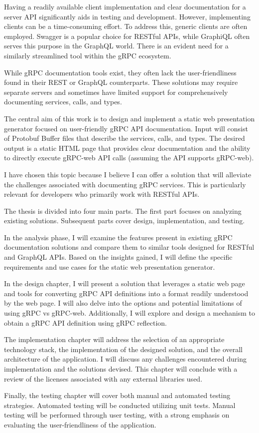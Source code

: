 Having a readily available client implementation and clear documentation for a server API significantly aids in testing and development.
However, implementing clients can be a time-consuming effort.
To address this, generic clients are often employed.
Swagger is a popular choice for RESTful APIs, while GraphiQL often serves this purpose in the GraphQL world.
There is an evident need for a similarly streamlined tool within the gRPC ecosystem.

While gRPC documentation tools exist, they often lack the user-friendliness found in their REST or GraphQL counterparts.
These solutions may require separate servers and sometimes have limited support for comprehensively documenting services, calls, and types.

The central aim of this work is to design and implement a static web presentation generator focused on user-friendly gRPC API documentation.
Input will consist of Protobuf Buffer files that describe the services, calls, and types.
The desired output is a static HTML page that provides clear documentation and the ability to directly execute gRPC-web API calls (assuming the API supports gRPC-web).

I have chosen this topic because I believe I can offer a solution that will alleviate the challenges associated with documenting gRPC services.
This is particularly relevant for developers who primarily work with RESTful APIs.

The thesis is divided into four main parts.
The first part focuses on analyzing existing solutions.
Subsequent parts cover design, implementation, and testing.

In the analysis phase, I will examine the features present in existing gRPC documentation solutions and compare them to similar tools designed for RESTful and GraphQL APIs.
Based on the insights gained, I will define the specific requirements and use cases for the static web presentation generator.

In the design chapter, I will present a solution that leverages a static web page and tools for converting gRPC API definitions into a format readily understood by the web page.
I will also delve into the options and potential limitations of using gRPC vs gRPC-web.
Additionally, I will explore and design a mechanism to obtain a gRPC API definition using gRPC reflection.

The implementation chapter will address the selection of an appropriate technology stack, the implementation of the designed solution, and the overall architecture of the application.
I will discuss any challenges encountered during implementation and the solutions devised.
This chapter will conclude with a review of the licenses associated with any external libraries used.

Finally, the testing chapter will cover both manual and automated testing strategies.
Automated testing will be conducted utilizing unit tests.
Manual testing will be performed through user testing, with a strong emphasis on evaluating the user-friendliness of the application.